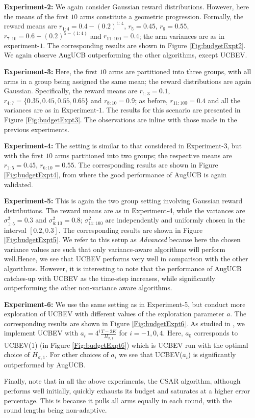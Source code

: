	
\textbf{Experiment-2:} We again consider  Gaussian reward distributions. However, here the means of the first $10$ arms constitute a geometric progression. Formally, the reward means are $r_{1:4}=0.4-(0.2)^{1:4}$, $r_{5}=0.45$, $r_{6}=0.55$, $r_{7:10}=0.6+(0.2)^{5-(1:4)}$ and $r_{11:100}=0.4$; the arm variances are as in experiment-$1$. The corresponding results are shown in Figure \ref{Fig:budgetExpt2}.  We again observe AugUCB outperforming the other algorithms, except UCBEV. 
	

\textbf{Experiment-3:} Here, the first
$10$ arms are partitioned into three groups, with all arms in a group being assigned the same mean; the reward distributions are again Gaussian. Specifically, the reward means are $r_{1:3}=0.1$, $r_{4:7}=\lbrace 0.35, 0.45, 0.55, 0.65\rbrace$ and $r_{8:10}=0.9$; as before,  $r_{11:100}=0.4$ and all the variances are as in Experiment-$1$. The results for this scenario are presented in Figure \ref{Fig:budgetExpt3}. The observations are inline with those made in the previous experiments. 


	
\textbf{Experiment-4:} The setting is similar to that considered in Experiment-3, but with the first $10$ arms partitioned into two groups; the respective means are $r_{1:5}=0.45$, $r_{6:10}=0.55$. The corresponding results are shown in Figure \ref{Fig:budgetExpt4}, from where the good performance of AugUCB is again validated.


\textbf{Experiment-5:} This is again the two group setting involving Gaussian reward distributions. The reward means are as in Experiment-4, while the variances are  $\sigma_{1:5}^{2}=0.3$ and $\sigma_{6:10}^{2}=0.8$;  $\sigma_{11:100}^{2}$ are independently and uniformly chosen in the interval $[0.2,0.3]$.  The corresponding results are shown in Figure \ref{Fig:budgetExpt5}.
 We refer to this setup as \emph{Advanced} because here the chosen variance values are such that only  variance-aware algorithms will perform well.Hence, we see that UCBEV performs very well in comparison with the other algorithms. However,  it is interesting to note that the performance of  AugUCB catches-up with UCBEV as the time-step increases, while significantly outperforming the other non-variance aware algorithms.


\textbf{Experiment-6:} We use the same setting as in Experiment-5, but conduct more exploration of UCBEV with different values of the exploration parameter $a$. The corresponding results are shown in Figure \ref{Fig:budgetExpt6}. As studied in \cite{locatelli2016optimal}, we implement UCBEV with $ a_{i} = 4^{i} \frac{T-2K}{H_{\sigma,1}}$ for $i = -1,0,4$. Here, $a_{0}$ corresponds to UCBEV($1$) (in Figure \ref{Fig:budgetExpt6}) which is UCBEV run with the optimal choice of $H_{\sigma ,1}$. For other choices of $a_i$ we see that UCBEV($a_i$) is significantly outperformed by AugUCB. 
	
Finally, note that in all the above experiments, the CSAR algorithm, although performs well initially, quickly exhausts its budget and saturates at a higher error percentage. This is because it pulls all arms equally in each round, with the round lengths being non-adaptive.





